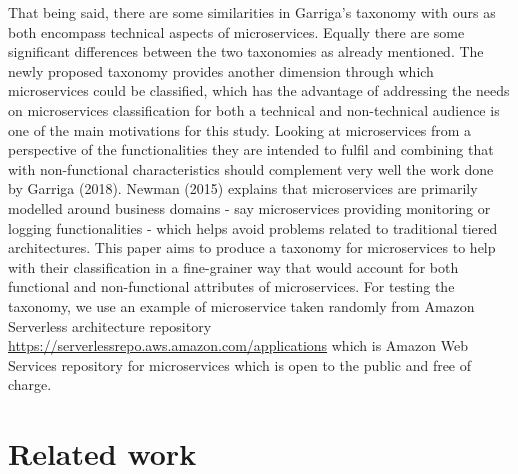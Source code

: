 \documentclass{article}
\begin{document}
That being said, there are some similarities in Garriga’s taxonomy with ours as both encompass technical aspects of microservices. Equally there are some significant differences between the two taxonomies as already mentioned. The newly proposed taxonomy provides another dimension through which microservices could be classified, which has the advantage of addressing the needs on microservices classification for both a technical and non-technical audience is one of the main motivations for this study. Looking at microservices from a perspective of the functionalities they are intended to fulfil and combining that with non-functional characteristics should complement very well the work done by Garriga (2018). Newman (2015) explains that microservices are primarily modelled around business domains - say microservices providing monitoring or logging functionalities - which helps avoid problems related to traditional tiered architectures. This paper aims to produce a taxonomy for microservices to help with their classification in a fine-grainer way that would account for both functional and non-functional attributes of microservices. For testing the taxonomy, we use an example of microservice taken randomly from Amazon Serverless architecture repository \url{https://serverlessrepo.aws.amazon.com/applications} which is Amazon Web Services repository for microservices which is open to the public and free of charge.


\section{Related work}
\end{document}
